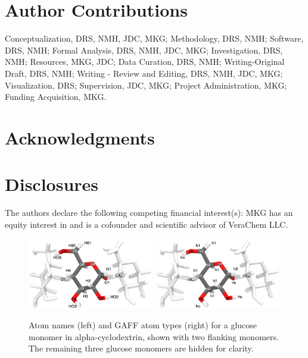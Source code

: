 \documentclass[9pt,lineno]{elife}
\begin{document}
\section{Author Contributions}
Conceptualization, DRS, NMH, JDC, MKG; Methodology, DRS, NMH; Software, DRS, NMH; Formal Analysis, DRS, NMH, JDC, MKG; Investigation, DRS, NMH; Resources, MKG, JDC;  Data Curation, DRS, NMH; Writing-Original Draft, DRS, NMH; Writing - Review and Editing, DRS, NMH, JDC, MKG; Visualization, DRS; Supervision, JDC, MKG; Project Administration, MKG; Funding Acquisition, MKG.

\section{Acknowledgments}
\section{Disclosures}
The authors declare the following competing financial interest(s): MKG has an equity interest in and is a cofounder and scientific advisor of VeraChem LLC.




\appendix
\begin{figure}[tb]
\centering
\includegraphics[width=0.49\textwidth]{images/atom-names-trimer.png}
\includegraphics[width=0.49\textwidth]{images/gaff-atom-types.png}
\caption{Atom names (left) and GAFF atom types (right) for a glucose monomer in alpha-cyclodextrin, shown with two flanking monomers. The remaining three glucose monomers are hidden for clarity.}
\label{fig:atom-names}
\end{figure}
\end{document}
